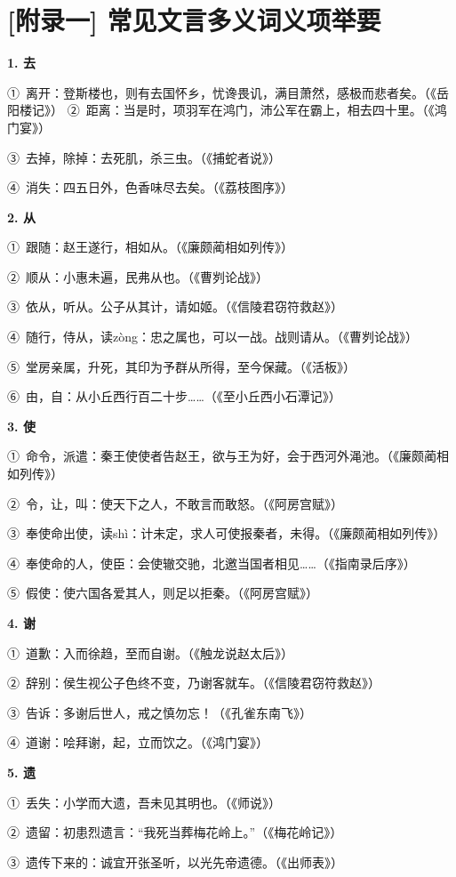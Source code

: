 
\section{[附录一] 常见文言多义词义项举要}

\textbf{1. 去}

①\ 离开：登斯楼也，则有去国怀乡，忧谗畏讥，满目萧然，感极而悲者矣。（《岳阳楼记》）
②\ 距离：当是时，项羽军在鸿门，沛公军在霸上，相去四十里。（《鸿门宴》）

③\ 去掉，除掉：去死肌，杀三虫。（《捕蛇者说》）

④\ 消失：四五日外，色香味尽去矣。（《荔枝图序》）

\textbf{2. 从}

①\ 跟随：赵王遂行，相如从。（《廉颇蔺相如列传》）

②\ 顺从：小惠未遍，民弗从也。（《曹刿论战》）

③\ 依从，听从。公子从其计，请如姬。（《信陵君窃符救赵》）

④\ 随行，侍从，读zòng：忠之属也，可以一战。战则请从。（《曹刿论战》）

⑤\ 堂房亲属，升死，其印为予群从所得，至今保藏。（《活板》）

⑥\ 由，自：从小丘西行百二十步……（《至小丘西小石潭记》）

\textbf{3. 使}

①\ 命令，派遣：秦王使使者告赵王，欲与王为好，会于西河外渑池。（《廉颇蔺相如列传》）

②\ 令，让，叫：使天下之人，不敢言而敢怒。（《阿房宫赋》）

③\ 奉使命出使，读shì：计未定，求人可使报秦者，未得。（《廉颇蔺相如列传》）

④\ 奉使命的人，使臣：会使辙交驰，北邀当国者相见……（《指南录后序》）

⑤\ 假使：使六国各爱其人，则足以拒秦。（《阿房宫赋》）

\textbf{4. 谢}

①\ 道歉：入而徐趋，至而自谢。（《触龙说赵太后》）

②\ 辞别：侯生视公子色终不变，乃谢客就车。（《信陵君窃符救赵》）

③\ 告诉：多谢后世人，戒之慎勿忘！（《孔雀东南飞》）

④\ 道谢：哙拜谢，起，立而饮之。（《鸿门宴》）

\textbf{5. 遗}

①\ 丢失：小学而大遗，吾未见其明也。（《师说》）

②\ 遗留：初患烈遗言：“我死当葬梅花岭上。”（《梅花岭记》）

③\ 遗传下来的：诚宜开张圣听，以光先帝遗德。（《出师表》）

